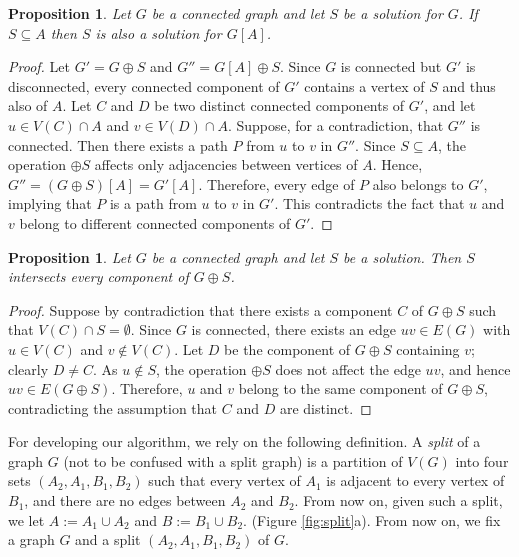 \documentclass[11pt]{article}
\newtheorem{proposition}[theorem]{Proposition}
\theoremstyle{definition}
\begin{document}
\begin{proposition}\label{prop:monotone-in-induced}
Let $G$ be a connected graph and 
let $S$ be a solution for $G$.
If $S \subseteq A$ then
 $S$ is also a solution for $G[A]$.
\end{proposition}
\begin{proof}
Let $G' = G \oplus S$ and $G'' = G[A] \oplus S$.
Since $G$ is connected but $G'$ is disconnected, every connected component of $G'$ contains a vertex of $S$ and thus also of $A$. Let $C$ and $D$ be two distinct connected components of $G'$, and let $u \in V(C)\cap A$ and $v \in V(D)\cap A$.
Suppose, for a contradiction, that $G''$ is connected. Then there exists a path $P$ from $u$ to $v$ in $G''$.
Since $S\subseteq A$, the operation $\oplus S$ affects only adjacencies between vertices of $A$. Hence,
$G''=(G\oplus S)[A]=G'[A].
$
Therefore, every edge of $P$ also belongs to $G'$, implying that $P$ is a path from $u$ to $v$ in $G'$. This contradicts the fact that $u$ and $v$ belong to different connected components of $G'$.
\end{proof}

\begin{proposition}\label{prop:S-intersects-every-component}
Let $G$ be a connected graph and let $S$ be a solution.
Then $S$ intersects every component of $G \oplus S$.
\end{proposition}

\begin{proof}
Suppose by contradiction that there exists a component $C$ of $G \oplus S$
such that $V(C) \cap S = \emptyset$.
Since $G$ is connected, there exists an edge $uv \in E(G)$ with
$u \in V(C)$ and $v \notin V(C)$.
Let $D$ be the component of $G \oplus S$ containing $v$; clearly $D \neq C$.
As $u \notin S$, the operation $\oplus S$ does not affect the edge $uv$,
and hence $uv \in E(G \oplus S)$.
Therefore, $u$ and $v$ belong to the same component of $G \oplus S$,
contradicting the assumption that $C$ and $D$ are distinct.
\end{proof}


For developing our algorithm, we rely on the following definition.
A \emph{split} of a graph $G$ (not to be confused with a split graph)
is a partition of $V(G)$ into four sets $(A_2, A_1, B_1, B_2)$ such that
every vertex of $A_1$ is adjacent to every vertex of $B_1$, and
there are no edges between $A_2$ and $B_2$.
From now on, given such a split, we let $A := A_1 \cup A_2$
and $B := B_1 \cup B_2$. (Figure \ref{fig:split}a).
From now on, we fix a graph $G$ and a split $(A_2,A_1,B_1,B_2)$ of $G$.
\end{document}
